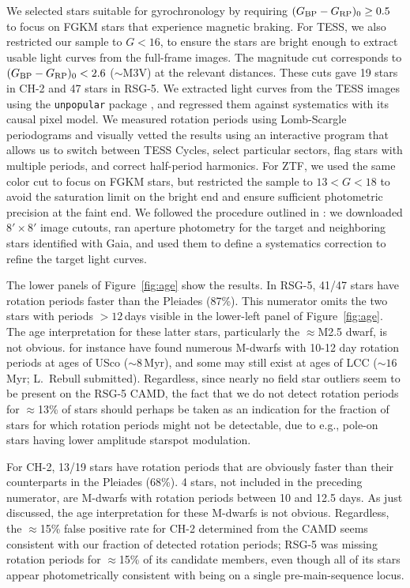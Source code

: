 \documentclass[12pt,twocolumn]{aastex63}
\newcommand{\bpmrpo}{(G_{\rm BP}-G_{\rm RP})_0}
\begin{document}
We selected stars suitable for gyrochronology by requiring $\bpmrpo
\geq 0.5$ to focus on FGKM stars that experience magnetic braking.
For TESS, we also restricted our sample to $G<16$, to ensure the stars
are bright enough to extract usable light curves from the full-frame
images.  The magnitude cut corresponds to $\bpmrpo < 2.6$
($\sim$M3V) at the relevant distances.  These cuts gave 19 stars in
CH-2 and 47 stars in RSG-5.  We extracted light curves from the TESS
images using the \texttt{unpopular} package \citep{hattorio_2021_cpm},
and regressed them against systematics with its causal pixel model.
We measured rotation periods using Lomb-Scargle periodograms and
visually vetted the results using an interactive program that allows
us to switch between TESS Cycles, select particular sectors, flag
stars with multiple periods, and correct half-period harmonics. For
ZTF, we used the same color cut to focus on FGKM stars, but restricted
the sample to $13 < G < 18$ to avoid the saturation limit on the
bright end and ensure sufficient photometric precision at the faint
end. We followed the procedure outlined in \citet{curtis_rup147_2020}:
we downloaded $8'\times8'$ image cutouts, ran aperture photometry for
the target and neighboring stars identified with Gaia, and used them
to define a systematics correction to refine the target light curves. 

The lower panels of Figure~\ref{fig:age} show the results.  In RSG-5,
41/47 stars have rotation periods faster than the Pleiades (87\%).
This numerator omits the two stars with periods $>$$12$\,days visible
in the lower-left panel of Figure~\ref{fig:age}.  The age
interpretation for these latter stars, particularly the $\approx$M2.5
dwarf, is not obvious.  \citet{rebull_usco_2018} for instance have
found numerous M-dwarfs with 10-12 day rotation periods at ages of
USco ($\sim$$8$\,Myr), and some may still exist at ages of LCC
($\sim$$16$\,Myr; L.~Rebull submitted).  Regardless, since
nearly no field star outliers seem to be present on the RSG-5 CAMD,
the fact that we do not detect rotation periods for $\approx$13\% of
stars should perhaps be taken as an indication for the fraction of
stars for which rotation periods might not be detectable, due to
{e.g.}, pole-on stars having lower amplitude starspot modulation.

For CH-2, 13/19 stars have rotation periods that are obviously faster
than their counterparts in the Pleiades (68\%).  4 stars, not included
in the preceding numerator, are M-dwarfs with rotation periods between
10 and 12.5 days.  As just discussed, the age interpretation for these
M-dwarfs is not obvious.  Regardless, the $\approx$15\% false positive
rate for CH-2 determined from the CAMD seems consistent with our
fraction of detected rotation periods; RSG-5 was missing rotation
periods for $\approx$15\% of its candidate members, even though all of
its stars appear photometrically consistent with being on a single
pre-main-sequence locus.
\end{document}
